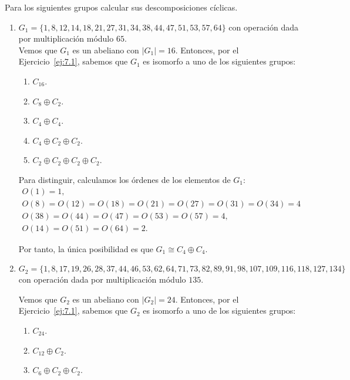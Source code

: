 \begin{ejercicio}\label{ej:7.2}
    Para los siguientes grupos calcular sus descomposiciones cíclicas.
    \begin{enumerate}
        \item $G_1 = \{1, 8, 12, 14, 18, 21, 27, 31, 34, 38, 44, 47, 51, 53, 57, 64\}$ con operación dada por multiplicación módulo $65$.\\
        
        Vemos que $G_1$ es un abeliano con $|G_1| = 16$. Entonces, por el Ejercicio~\ref{ej:7.1}, sabemos que $G_1$ es isomorfo a uno de los siguientes grupos:
        \begin{enumerate}
            \item $C_{16}$.
            \item $C_8 \oplus C_2$.
            \item $C_4 \oplus C_4$.
            \item $C_4 \oplus C_2 \oplus C_2$.
            \item $C_2 \oplus C_2 \oplus C_2 \oplus C_2$.
        \end{enumerate}

        Para distinguir, calculamos los órdenes de los elementos de $G_1$:
        \begin{gather*}
            O(1) = 1, \\
            O(8) = O(12) = O(18) = O(21) = O(27) = O(31) = O(34) = 4\\
            O(38) = O(44) = O(47) = O(53) = O(57) = 4, \\
            O(14) = O(51) = O(64) = 2.
        \end{gather*}

        Por tanto, la única posibilidad es que $G_1 \cong C_4 \oplus C_4$.
        \item $G_2 = \{1, 8, 17, 19, 26, 28, 37, 44, 46, 53, 62, 64, 71, 73, 82, 89, 91, 98, 107,109, 116, 118, 127, 134\}$ con operación dada por multiplicación módulo $135$.
        
        Vemos que $G_2$ es un abeliano con $|G_2| = 24$. Entonces, por el Ejercicio~\ref{ej:7.1}, sabemos que $G_2$ es isomorfo a uno de los siguientes grupos:
        \begin{enumerate}
            \item $C_{24}$.
            \item $C_{12} \oplus C_2$.
            \item $C_6 \oplus C_2 \oplus C_2$.
        \end{enumerate}


\end{enumerate}
\end{ejercicio}
